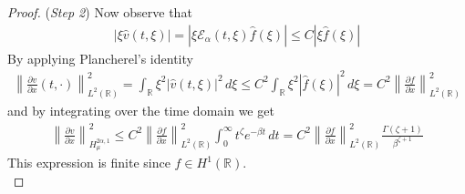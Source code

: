 \documentclass[10pt,a4paper]{article}
\numberwithin{equation}{section}
\theoremstyle{plain}
\theoremstyle{remark}
\begin{document}
\begin{proof}
({\it Step 2}) Now observe that
\begin{align*}
|\xi \hat{v}(t, \xi)| = |\xi \mathcal{E}_\alpha(t, \xi) \hat{f}(\xi)| \le C |\xi \hat{f}(\xi)|
\end{align*}
By applying Plancherel's identity 
\begin{align*}
\left\|\frac{\partial v}{\partial x}(t, \cdot)\right\|^2_{L^2(\mathbb{R})} = \int_{\mathbb{R}} \xi^2 |\hat{v}(t, \xi)|^2 \, d\xi \le C^2 \int_{\mathbb{R}} \xi^2 |\hat{f}(\xi)|^2 \, d\xi = C^2 \left\|\frac{\partial f}{\partial x}\right\|^2_{L^2(\mathbb{R})}
\end{align*}
and by integrating over the time domain we get
\begin{align*}
\left\|\frac{\partial v}{\partial x}\right\|^2_{H^{2\alpha, 1}_\mu} \le C^2 \left\|\frac{\partial f}{\partial x}\right\|^2_{L^2(\mathbb{R})} \int_0^\infty t^\zeta e^{-\beta t} \, dt = C^2 \left\|\frac{\partial f}{\partial x}\right\|^2_{L^2(\mathbb{R})} \frac{\Gamma(\zeta + 1)}{\beta^{\zeta + 1}}
\end{align*}
This expression is finite since $f \in H^1(\mathbb{R})$.\\


\end{proof}
\end{document}
